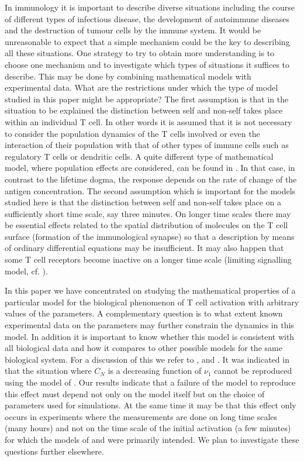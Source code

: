 \documentclass{article}
\begin{document}
In immunology it is important to describe diverse situations including the 
course of different types of infectious disease, the development of autoimmune
diseases and the destruction of tumour cells by the immune system. It would be 
unreasonable to expect that a simple mechanism could be the key to describing 
all these situations. One strategy to try to obtain more understanding is to
choose one mechanism and to investigate which types of situations it suffices 
to describe. This may be done by combining mathematical models with experimental
data. What are the restrictions under which the type of model studied in this
paper might be appropriate? The first assumption is that in the situation to
be explained the distinction between self and non-self takes place within an
individual T cell. In other words it is assumed that it is not necessary to 
consider the population dynamics of the T cells involved or even the interaction
of their population with that of other types of immune cells such as 
regulatory T cells or dendritic cells. A quite different type of mathematical
model, where population effects are considered, can be found in 
\cite{sontag17}. 
In that case, in contrast to the lifetime dogma, the response depends on the 
rate of change of the antigen concentration. The second assumption which is 
important for the models studied here is that the distinction between self and 
non-self takes place on a sufficiently short time scale, say three minutes. On 
longer time scales there may be essential effects related to the spatial 
distribution of molecules on the T cell surface (formation of the 
immunological synapse) so that a description by means of ordinary differential 
equations may be insufficient. It may also happen that some T cell receptors 
become 
inactive on a longer time scale (limiting signalling model, cf. \cite{lever16}).

In this paper we have concentrated on studying the mathematical properties
of a particular model for the biological phenomenon of T cell activation
with arbitrary values of the parameters. A complementary question is to
what extent known experimental data on the parameters may further 
constrain the dynamics in this model. In addition it is important to know
whether this model is consistent with all biological data and how it 
compares to other possible models for the same biological system. For a 
discussion of this we refer to \cite{lever14}, \cite{francois15} and
\cite{lever16}. It was indicated in \cite{lever16} that the situation
where $C_N$ is a decreasing function of $\nu_1$ cannot be reproduced using
the model of \cite{francois13}. Our results indicate that a failure of the
model to reproduce this effect must depend not only on the model itself
but on the choice of parameters used for simulations. At the same time it 
may be that this effect only occurs in experiments where the measurements 
are done on long time scales (many hours) and not on the time scale of 
the initial activation (a few minutes) for which the models of 
\cite{altanbonnet05} and \cite{francois13} were primarily intended.
We plan to investigate these questions further elsewhere.
\end{document}
